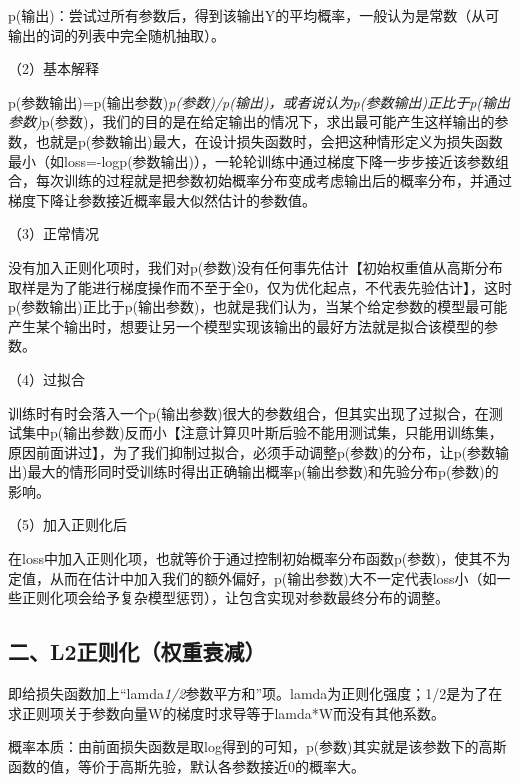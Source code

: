 p(输出)：尝试过所有参数后，得到该输出Y的平均概率，一般认为是常数（从可输出的词的列表中完全随机抽取）。

（2）基本解释

p(参数\textbar 输出)=p(输出\textbar 参数)\emph{p(参数)/p(输出)，或者说认为p(参数\textbar 输出)正比于p(输出\textbar 参数)}p(参数)，我们的目的是在给定输出的情况下，求出最可能产生这样输出的参数，也就是p(参数\textbar 输出)最大，在设计损失函数时，会把这种情形定义为损失函数最小（如loss=-logp(参数\textbar 输出)），一轮轮训练中通过梯度下降一步步接近该参数组合，每次训练的过程就是把参数初始概率分布变成考虑输出后的概率分布，并通过梯度下降让参数接近概率最大似然估计的参数值。

（3）正常情况

没有加入正则化项时，我们对p(参数)没有任何事先估计【初始权重值从高斯分布取样是为了能进行梯度操作而不至于全0，仅为优化起点，不代表先验估计】，这时p(参数\textbar 输出)正比于p(输出\textbar 参数)，也就是我们认为，当某个给定参数的模型最可能产生某个输出时，想要让另一个模型实现该输出的最好方法就是拟合该模型的参数。

（4）过拟合

训练时有时会落入一个p(输出\textbar 参数)很大的参数组合，但其实出现了过拟合，在测试集中p(输出\textbar 参数)反而小【注意计算贝叶斯后验不能用测试集，只能用训练集，原因前面讲过】，为了我们抑制过拟合，必须手动调整p(参数)的分布，让p(参数\textbar 输出)最大的情形同时受训练时得出正确输出概率p(输出\textbar 参数)和先验分布p(参数)的影响。

（5）加入正则化后

在loss中加入正则化项，也就等价于通过控制初始概率分布函数p(参数)，使其不为定值，从而在估计中加入我们的额外偏好，p(输出\textbar 参数)大不一定代表loss小（如一些正则化项会给予复杂模型惩罚），让包含实现对参数最终分布的调整。

\hypertarget{ux4e8cl2ux6b63ux5219ux5316ux6743ux91cdux8870ux51cf}{%
\subsection{二、L2正则化（权重衰减）}\label{ux4e8cl2ux6b63ux5219ux5316ux6743ux91cdux8870ux51cf}}

即给损失函数加上``lamda\emph{1/2}参数平方和''项。lamda为正则化强度；1/2是为了在求正则项关于参数向量W的梯度时求导等于lamda*W而没有其他系数。

概率本质：由前面损失函数是取log得到的可知，p(参数)其实就是该参数下的高斯函数的值，等价于高斯先验，默认各参数接近0的概率大。

